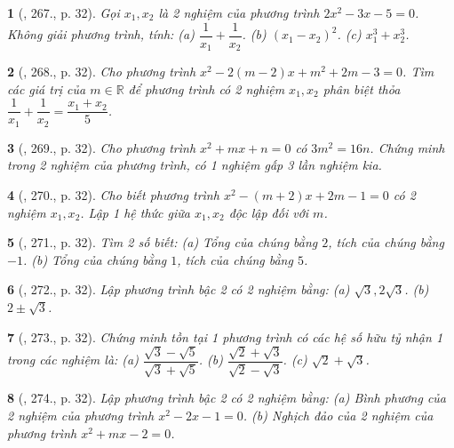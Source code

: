 \documentclass{article}
\newtheorem{baitoan}{}
\begin{document}
\begin{baitoan}[\cite{Binh_Toan_9_tap_2}, 267., p. 32]
	Gọi $x_1,x_2$ là 2 nghiệm của phương trình $2x^2 - 3x - 5 = 0$. Không giải phương trình, tính: (a) $\dfrac{1}{x_1} + \dfrac{1}{x_2}$. (b) $(x_1 - x_2)^2$. (c) $x_1^3 + x_2^3$.
\end{baitoan}

\begin{baitoan}[\cite{Binh_Toan_9_tap_2}, 268., p. 32]
	Cho phương trình $x^2 - 2(m - 2)x + m^2 + 2m - 3 = 0$. Tìm các giá trị của $m\in\mathbb{R}$ để phương trình có 2 nghiệm $x_1,x_2$ phân biệt thỏa $\dfrac{1}{x_1} + \dfrac{1}{x_2} = \dfrac{x_1 + x_2}{5}$.
\end{baitoan}

\begin{baitoan}[\cite{Binh_Toan_9_tap_2}, 269., p. 32]
	Cho phương trình $x^2 + mx + n = 0$ có $3m^2 = 16n$. Chứng minh trong 2 nghiệm của phương trình, có 1 nghiệm gấp 3 lần nghiệm kia.
\end{baitoan}

\begin{baitoan}[\cite{Binh_Toan_9_tap_2}, 270., p. 32]
	Cho biết phương trình $x^2 - (m + 2)x + 2m - 1 = 0$ có 2 nghiệm $x_1,x_2$. Lập 1 hệ thức giữa $x_1,x_2$ độc lập đối với $m$.
\end{baitoan}

\begin{baitoan}[\cite{Binh_Toan_9_tap_2}, 271., p. 32]
	Tìm 2 số biết: (a) Tổng của chúng bằng $2$, tích của chúng bằng $-1$. (b) Tổng của chúng bằng $1$, tích của chúng bằng $5$.
\end{baitoan}

\begin{baitoan}[\cite{Binh_Toan_9_tap_2}, 272., p. 32]
	Lập phương trình bậc 2 có 2 nghiệm bằng: (a) $\sqrt{3},2\sqrt{3}$. (b) $2\pm\sqrt{3}$.
\end{baitoan}

\begin{baitoan}[\cite{Binh_Toan_9_tap_2}, 273., p. 32]
	Chứng minh tồn tại 1 phương trình có các hệ số hữu tỷ nhận 1 trong các nghiệm là: (a) $\dfrac{\sqrt{3} - \sqrt{5}}{\sqrt{3} + \sqrt{5}}$. (b) $\dfrac{\sqrt{2} + \sqrt{3}}{\sqrt{2} - \sqrt{3}}$. (c) $\sqrt{2} + \sqrt{3}$.
\end{baitoan}

\begin{baitoan}[\cite{Binh_Toan_9_tap_2}, 274., p. 32]
	Lập phương trình bậc 2 có 2 nghiệm bằng: (a) Bình phương của 2 nghiệm của phương trình $x^2 - 2x - 1 = 0$. (b) Nghịch đảo của 2 nghiệm của phương trình $x^2 + mx - 2 = 0$.
\end{baitoan}
\end{document}
